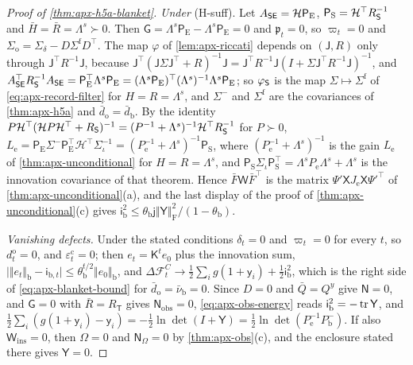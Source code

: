 \begin{proof}[Proof of \cref{thm:apx-h5a-blanket}]
\emph{Under} (H-suff). Let $A_{\mathsf{S}\mathsf{E}}=\mathcal H\mathsf P_{\mathrm E}$, $\mathsf P_{\mathrm S}=\mathcal H^\top R_{\mathsf{S}}^{-1}$ and $\bar H=\bar R=\Lambda^s\succ0$. Then $\mathsf G=\Lambda^s\mathsf P_{\mathrm E}-\Lambda^s\mathsf P_{\mathrm E}=0$ and $\mathfrak p_t=0$, so $\varpi_t=0$ and $\Sigma_{\mathrm o}=\Sigma_\delta-D\Sigma^{\mathrm f}D^\top$. The map $\varphi$ of \cref{lem:apx-riccati} depends on $(\mathsf J,R)$ only through $\mathsf J^\top R^{-1}\mathsf J$, because $\mathsf J^\top(\mathsf J\Sigma\mathsf J^\top+R)^{-1}\mathsf J=\mathsf J^\top R^{-1}\mathsf J(I+\Sigma\mathsf J^\top R^{-1}\mathsf J)^{-1}$, and $A_{\mathsf{S}\mathsf{E}}^\top R_{\mathsf{S}}^{-1}A_{\mathsf{S}\mathsf{E}}=\mathsf P_{\mathrm E}^\top\Lambda^s\mathsf P_{\mathrm E}=(\Lambda^s\mathsf P_{\mathrm E})^\top(\Lambda^s)^{-1}\Lambda^s\mathsf P_{\mathrm E}$; so $\varphi_{\mathsf{S}}$ is the map $\Sigma\mapsto\Sigma^{\mathrm f}$ of \eqref{eq:apx-record-filter} for $H=R=\Lambda^s$, and $\Sigma^-$ and $\Sigma^{\mathrm f}$ are the covariances of \cref{thm:apx-h5a} and $\bar d_{\mathrm o}=\bar d_{\mathrm b}$. By the identity $P\mathcal H^\top(\mathcal HP\mathcal H^\top+R_{\mathsf{S}})^{-1}=(P^{-1}+\Lambda^s)^{-1}\mathcal H^\top R_{\mathsf{S}}^{-1}$ for $P\succ0$, $L_{\mathrm e}=\mathsf P_{\mathrm E}\Sigma^-\mathsf P_{\mathrm E}^\top\mathcal H^\top\Sigma_\iota^{-1}=(P_{\mathrm e}^{-1}+\Lambda^s)^{-1}\mathsf P_{\mathrm S}$, where $(P_{\mathrm e}^{-1}+\Lambda^s)^{-1}$ is the gain $L_{\mathrm e}$ of \cref{thm:apx-unconditional} for $H=R=\Lambda^s$, and $\mathsf P_{\mathrm S}\Sigma_\iota\mathsf P_{\mathrm S}^\top=\Lambda^sP_{\mathrm e}\Lambda^s+\Lambda^s$ is the innovation covariance of that theorem. Hence $\bar F\mathsf W\bar F^\top$ is the matrix $\Psi'\mathsf XJ_{\mathrm e}\mathsf X\Psi'^\top$ of \cref{thm:apx-unconditional}(a), and the last display of the proof of \cref{thm:apx-unconditional}(c) gives $\mathsf i_{\mathrm b}^2\le\theta_{\mathrm b}\mathsf j\Vert\mathsf Y\Vert_{\mathrm F}^2/(1-\theta_{\mathrm b})$.

\emph{Vanishing defects.} Under the stated conditions $\delta_t=0$ and $\varpi_t=0$ for every $t$, so $d^{\mathrm o}_t=0$, and $\varepsilon^{\mathrm c}_t=0$; then $e_t=\mathsf K^te_0$ plus the innovation sum, $\lvert\Vert e_t\Vert_{\mathrm b}-\mathsf i_{\mathrm b,t}\rvert\le\theta_{\mathrm b}^{t/2}\Vert e_0\Vert_{\mathrm b}$, and $\Delta\mathcal F^C_t\to\frac12\sum_ig(1+\mathsf y_i)+\frac12\mathsf i_{\mathrm b}^2$, which is the right side of \eqref{eq:apx-blanket-bound} for $\bar d_{\mathrm o}=\bar\nu_{\mathrm b}=0$. Since $D=0$ and $\bar Q=Q^y$ give $\mathsf N=0$, and $\mathsf G=0$ with $\bar R=R_{\mathsf T}$ gives $\mathsf N_{\mathrm{obs}}=0$, \eqref{eq:apx-obs-energy} reads $\mathsf i_{\mathrm b}^2=-\operatorname{tr}\mathsf Y$, and $\frac12\sum_i(g(1+\mathsf y_i)-\mathsf y_i)=-\frac12\ln\det(I+\mathsf Y)=\frac12\ln\det(P_{\mathrm e}^{-1}P^-_{\mathrm b})$. If also $\mathsf W_{\mathrm{ins}}=0$, then $\Omega=0$ and $\mathsf N_\Omega=0$ by \cref{thm:apx-obs}(c), and the enclosure stated there gives $\mathsf Y=0$.


\end{proof}
